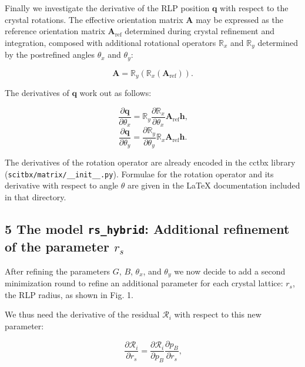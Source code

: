 \documentclass[12pt, letterpaper]{article}
\begin{document}
Finally we investigate the derivative of the RLP position $\mathbf{q}$ with respect to the crystal 
rotations.  The effective orientation matrix $\mathbf{A}$ may be expressed as the 
reference orientation matrix $\mathbf{A}_\mathrm{ref}$ determined during crystal refinement and 
integration, composed with additional rotational operators $\mathbb{R}_x$ and 
$\mathbb{R}_y$ determined by the postrefined angles $\theta_{x}$ and 
$\theta_{y}$:

    \begin{equation}
   \mathbf{A} = 
\mathbb{R}_y( \mathbb{R}_x ( \mathbf{A}_\mathrm{ref} )  )
    \text{.}
    \label{eqn:compoase}
  \end{equation}

The derivatives of $\mathbf{q}$ work out as follows:

  \begin{equation}
   \dfrac{\partial \mathbf{q}} {\partial \theta_{x}} = 
  \mathbb{R}_y \dfrac{\partial\mathbb{R}_x}{\partial \theta_{x}}  \mathbf{A}_\mathrm{ref} \mathbf{h}
    \text{,}
    \label{eqn:qthx}
  \end{equation}
  \begin{equation}
   \dfrac{\partial \mathbf{q}} {\partial \theta_{y}} = 
  \dfrac{\partial\mathbb{R}_y}{\partial \theta_{y}} \mathbb{R}_x \mathbf{A}_\mathrm{ref} \mathbf{h}
    \text{.}
    \label{eqn:qthy}
  \end{equation}

The derivatives of the rotation operator are already encoded in the cctbx library ({\tt scitbx/matrix/\_\_init\_\_.py}).  Formulae for the rotation operator and its derivative with 
respect to angle $\theta$ are given in the LaTeX documentation included in that directory.

  \subsection*{5 The model { \tt rs\_hybrid}: Additional refinement of the parameter $r_s$ }
After refining the parameters $G$, $B$, $\theta_{x}$, and $\theta_{y}$
we now decide to add a second minimization round to refine an additional parameter for each crystal lattice:
$r_s$, the RLP radius, as shown in Fig. 1.

\par We thus need the derivative of the residual $\mathscr{R}_i$ with respect to this new parameter:
        
   \begin{equation}
    \frac{\partial\mathscr{R}_i}{\partial r_s} = 
  \frac{\partial\mathscr{R}_i}{\partial p_B}
   \frac{\partial p_B} {\partial r_s}
    \text{,}
    \label{eqn:dRrs}
  \end{equation}
\end{document}
